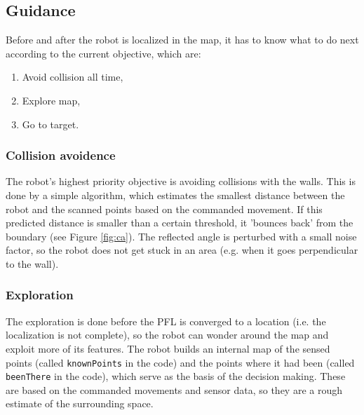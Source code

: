 \subsection{Guidance}

	Before and after the robot is localized in the map, it has to know what to do next according to the current objective, which are:
	\begin{enumerate}
		\item Avoid collision all time,
		\item Explore map,
		\item Go to target.
	\end{enumerate}
	
	\subsubsection{Collision avoidence}
	
		The robot's highest priority objective is avoiding collisions with the walls. This is done by a simple algorithm, which estimates the smallest distance between the robot and the scanned points based on the commanded movement. If this predicted distance is smaller than a certain threshold, it 'bounces back' from the boundary (see Figure \ref{fig:ca}). The reflected angle is perturbed with a small noise factor, so the robot does not get stuck in an area (e.g. when it goes perpendicular to the wall).
		
%		    
	
	\subsubsection{Exploration}
	
		The exploration is done before the PFL is converged to a location (i.e. the localization is not complete), so the robot can wonder around the map and exploit more of its features. The robot builds an internal map of the sensed points (called {\tt knownPoints} in the code) and the points where it had been (called {\tt beenThere} in the code), which serve as the basis of the decision making. These are based on the commanded movements and sensor data, so they are a rough estimate of the surrounding space. 
		
